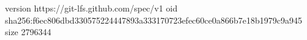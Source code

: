 version https://git-lfs.github.com/spec/v1
oid sha256:f6ec806dbd330575224447893a333170723efec60ce0a866b7e18b1979c9a945
size 2796344
